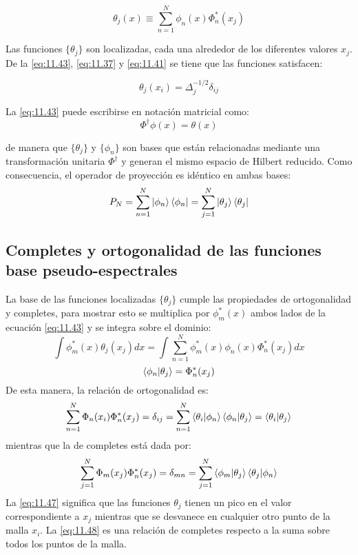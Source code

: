 \begin{equation}
  \label{eq:11.43}
  \theta_j(x) \equiv \sum_{n=1}^N\phi_n(x)\Phi_n^*(x_j)
\end{equation}

Las funciones $\{\theta_j\}$ son localizadas, cada una alrededor de los diferentes valores $x_j$. De la \autoref{eq:11.43}, \autoref{eq:11.37} y \autoref{eq:11.41} se tiene que las funciones satisfacen:

\begin{equation}
  \label{eq:11.44}
  \theta_j(x_i) = \Delta_j^{-1/2}\delta_{ij}
\end{equation}

La \autoref{eq:11.43} puede escribirse en notación matricial como:
\begin{equation}
  \label{eq:11.45}
  \Phi^{\dag}\phi(x) = \theta(x)
\end{equation}

de manera que $\{\theta_j\}$ y $\{\phi_n \}$ son bases que están relacionadas mediante una transformación unitaria $\Phi^{\dag}$ y generan el mismo espacio de Hilbert reducido. Como consecuencia, el operador de proyección es idéntico en ambas bases:
\begin{equation}
  \label{eq:proyecbases}
  P_N = \sum_{n=1}^N\ket{\phi_n}\bra{\phi_n}=\sum_{j=1}^N\ket{\theta_j}\bra{\theta_j}
\end{equation}

\subsection{Completes y ortogonalidad de las funciones base pseudo-espectrales}
La base de las funciones localizadas $\{\theta_j\}$ cumple las propiedades de ortogonalidad y completes, para mostrar esto se multiplica por $\phi^*_m(x)$ ambos lados de la ecuación \autoref{eq:11.43} y se integra sobre el dominio:
$$ \int \phi^*_m(x) \theta_j(x_j) dx = \int \sum_{n=1}^{N}\phi^*_m(x)\phi_n(x)\Phi^*_n(x_j) dx$$
\begin{equation}
  \label{eq:11.46}
\bra{\phi_n} \ket{\theta_j} =   \Phi^*_n(x_j) 
\end{equation}
De esta manera, la relación de ortogonalidad es:
\begin{equation}
  \label{eq:11.47}
  \sum_{n=1}^N \Phi_n(x_i)\Phi_n^*(x_j) = \delta_{ij}=\sum_{n=1}^{N}\bra{\theta_i}\ket{\phi_n}\bra{\phi_n}\ket{\theta_j} = \bra{\theta_i}\ket{\theta_j}
\end{equation}
mientras que la de completes está dada por:
\begin{equation}
  \label{eq:11.48}
  \sum_{j=1}^N \Phi_m(x_j)\Phi_n^*(x_j) = \delta_{mn} = \sum_{j=1}^N \bra{\phi_m} \ket{\theta_j} \bra{\theta_j}\ket{\phi_n}
\end{equation}
La \autoref{eq:11.47} significa que las funciones $\theta_j$ tienen un pico en el valor correspondiente a $x_j$ mientras que se desvanece en cualquier otro punto de la malla $x_i$. La \autoref{eq:11.48} es una relación de completes respecto a la suma sobre todos los puntos de la malla.

